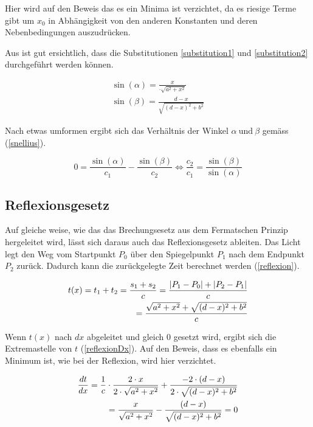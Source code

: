 Hier wird auf den Beweis das es ein Minima ist verzichtet, da es riesige Terme gibt um $x_0$ in Abhängigkeit von den anderen Konstanten und deren Nebenbedingungen auszudrücken.

Aus  ist gut ersichtlich, dass die Substitutionen \ref{substitution1} und \ref{substitution2} durchgeführt werden können.

\begin{align}
	\sin(\alpha) = \frac{x}{\cdot \sqrt{a^2 + x^2}}  \label{substitution1}\\
	\sin(\beta) = \frac{d-x}{\sqrt{(d -x)^2 + b^2}} \label{substitution2}
\end{align}

Nach etwas umformen ergibt sich das Verhältnis der Winkel $\alpha \ \text{und} \ \beta$ gemäss (\eqref{snellius}).

\begin{equation}
	0 = \frac{\sin(\alpha)}{c_1} - \frac{\sin(\beta)}{c_2} \Leftrightarrow\frac{c_2}{c_1} = \frac{\sin(\beta)}{\sin(\alpha)}
	\label{snellius}
\end{equation}


\subsection{Reflexionsgesetz}
\cite{Wikipedia} Auf gleiche weise, wie das das Brechungsesetz aus dem Fermatschen Prinzip hergeleitet wird, 
lässt sich daraus auch das Reflexionsgesetz ableiten.
Das Licht legt den Weg vom Startpunkt $P_0$ über den Spiegelpunkt $P_1$ 
nach dem Endpunkt $P_2$ zurück. Dadurch kann die zurückgelegte Zeit berechnet werden (\eqref{reflexion}).


\begin{align}
t(x) = t_1 + t_2 = \frac{s_1 + s_2}{c} = \frac{|P_1 - P_0| + |P_2 - P_1|}{c} \notag \\
= \frac{\sqrt{a^2 + x^2} + \sqrt{(d-x)^2 + b^2}}{c} \label{reflexion}
\end{align}

Wenn $t(x)$ nach $dx$ abgeleitet und gleich 0 gesetzt wird, ergibt sich die Extremastelle  von $t$ (\eqref{reflexionDx}). Auf den Beweis, dass es ebenfalls ein Minimum ist, wie bei der Reflexion, wird hier verzichtet.

\begin{align}
\frac{dt}{dx} = \frac{1}{c} \cdot \frac{2 \cdot x}{2 \cdot \sqrt{a^2 + x^2}} + \frac{-2 \cdot (d-x)}{2 \cdot \sqrt{(d-x)^2 + b^2}} \notag \\
= \frac{x}{ \sqrt{a^2 + x^2}} - \frac{(d-x)}{ \sqrt{(d-x)^2 + b^2}} = 0 \label{reflexionDx}
\end{align}


